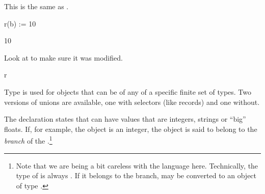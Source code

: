 \begin{xtc}
\begin{xtccomment}
This is the same as .
\end{xtccomment}
\begin{spadsrc}
r(b) := 10 
\end{spadsrc}
\begin{TeXOutput}
\begin{fricasmath}{17}
10%
\end{fricasmath}
\end{TeXOutput}
\end{xtc}
\begin{xtc}
\begin{xtccomment}
Look at  to make sure it was modified.
\end{xtccomment}
\begin{spadsrc}
r 
\end{spadsrc}
\begin{TeXOutput}
\begin{fricasmath}{18}
%
\end{fricasmath}
\end{TeXOutput}
\end{xtc}

%
Type  is used for objects that
can be of any of a specific finite set of types.
Two versions of unions are available,
one with selectors (like records) and one without.


The declaration 
states that  can have values that are integers,
strings or ``big'' floats.
If, for example, the  object is an integer, the object is
said to belong to the  {\it branch}
of the .\footnote{
Note that we are being a bit careless with the language here.
Technically, the type of  is always
.
If it belongs to the  branch, 
may be converted to an object of type .}

